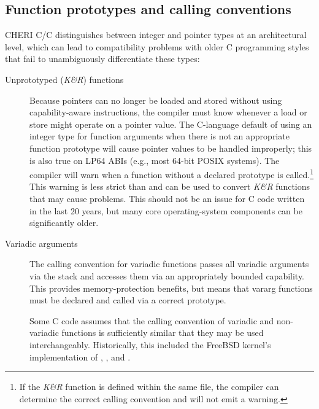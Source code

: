 \documentclass[12pt,twoside,openright,a4paper]{article}
\newcommand{\ccode}[1]{{\small\ttfamily{#1}}}
\newcommand{\cfunc}[1]{{\ccode{#1()}}}
\newcommand{\commandline}[1]{{\ccode{#1}}}
\newcommand{\note}[2]{{\color{blue}[ Note: #1 - #2]}}
\renewcommand{\note}[2]{\relax\ifhmode\unskip\fi}
\newcommand{\arnote}[1]{\note{#1}{Alex R.}}
\newcommand{\rwnote}[1]{\note{#1}{Robert W.}}
\newcommand*{\cpp}[1][]{C\textsmaller[2]{\nolinebreak[4]\hspace{-.05em}\raisebox{.45ex}{\textbf{++}}}}
\begin{document}
\subsection{Function prototypes and calling conventions}

CHERI C/\cpp{} distinguishes between integer and pointer types at an
architectural level, which can lead to compatibility problems with older C
programming styles that fail to unambiguously differentiate these types:

\begin{description}
\item[Unprototyped (\textit{K\&R}) functions] Because pointers can no longer
  be loaded and stored without using capability-aware instructions, the
  compiler must know whenever a load or store might operate on a pointer
  value.
  The C-language default of using an integer type for function arguments when
  there is not an appropriate function prototype will cause pointer values to
  be handled improperly; this is also true on LP64 ABIs (e.g., most 64-bit
  POSIX systems).
  The compiler will warn when a function without a declared prototype is
  called.\footnote{If the \textit{K\&R} function is defined within the same
  file, the compiler can determine the correct calling convention and will not
  emit a warning.}
  This warning is less strict than \commandline{-Wstrict-prototypes} and can be
  used to convert \textit{K\&R} functions that may cause problems.
  This should not be an issue for C code written in the last 20 years, but
  many core operating-system components can be significantly older.

\item[Variadic arguments] The calling convention for variadic functions
  passes all variadic arguments via the stack and accesses them via an
  appropriately bounded capability.
  This provides memory-protection benefits, but means that vararg functions
  must be declared and called via a correct prototype.

  Some C code assumes that the calling convention of variadic and non-variadic
  functions is sufficiently similar that they may be used interchangeably.
  Historically, this included the FreeBSD kernel's implementation of
  \cfunc{open}, \cfunc{fcntl}, and \cfunc{syscall}.

  \rwnote{I wonder if we need to be more specific with an example here.}\arnote{TODO: Add example such as missing open() mode arguments?}

\end{description}
\end{document}
